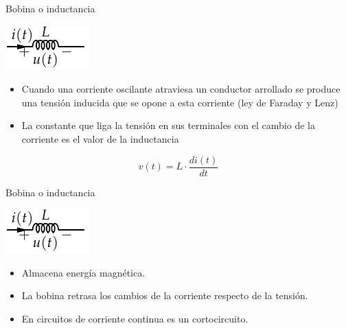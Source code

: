 \documentclass[xcolor={usenames,svgnames,dvipsnames}]{beamer}
\begin{document}
\begin{frame}[label={sec:org413047a}]{Bobina o inductancia}
\begin{center}
\includegraphics[height=0.2\textheight]{../figs/Bobina.pdf}
\end{center}


\begin{itemize}
\item Cuando una corriente oscilante atraviesa un conductor arrollado se
produce una \alert{tensión inducida que se opone a esta corriente} (ley de
Faraday y Lenz)

\item La constante que liga la tensión en sus terminales con el cambio de
la corriente es el valor de la inductancia
\end{itemize}

\[
v(t)=L\cdot\frac{di(t)}{dt}
\]
\end{frame}

\begin{frame}[label={sec:org5f8c538}]{Bobina o inductancia}
\begin{center}
\includegraphics[height=0.2\textheight]{../figs/Bobina.pdf}
\end{center}


\begin{itemize}
\item Almacena \alert{energía magnética}.

\item La bobina \alert{retrasa los cambios de la corriente} respecto de la
tensión.

\item En circuitos de corriente continua es un cortocircuito.
\end{itemize}
\end{frame}
\end{document}
